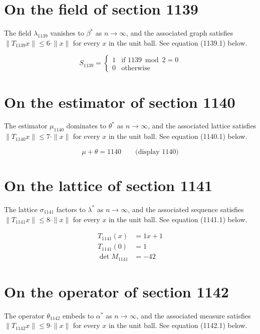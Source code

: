 \documentclass{article}
\begin{document}
\section{On the field of section 1139}
The field $\lambda_{1139}$ vanishes to $\beta^{*}$ as $n \to \infty$,
and the associated graph satisfies $\|T_{1139} x\| \leq 6 \cdot \|x\|$
for every $x$ in the unit ball. See equation (1139.1) below.

\begin{equation}
S_{1139} = \begin{cases} 1 & \text{if } 1139 \bmod 2 = 0 \\ 0 & \text{otherwise} \end{cases}
\end{equation}

\section{On the estimator of section 1140}
The estimator $\mu_{1140}$ dominates to $\theta^{*}$ as $n \to \infty$,
and the associated lattice satisfies $\|T_{1140} x\| \leq 7 \cdot \|x\|$
for every $x$ in the unit ball. See equation (1140.1) below.

$$
\mu + \theta = 1140 \qquad \text{(display 1140)}
$$

\section{On the lattice of section 1141}
The lattice $\sigma_{1141}$ factors to $\lambda^{*}$ as $n \to \infty$,
and the associated sequence satisfies $\|T_{1141} x\| \leq 8 \cdot \|x\|$
for every $x$ in the unit ball. See equation (1141.1) below.

\begin{align}
T_{1141}(x) &= 1 x + 1 \\
T_{1141}(0) &= 1 \\
\det M_{1141} &= -42
\end{align}

\section{On the operator of section 1142}
The operator $\theta_{1142}$ embeds to $\alpha^{*}$ as $n \to \infty$,
and the associated measure satisfies $\|T_{1142} x\| \leq 9 \cdot \|x\|$
for every $x$ in the unit ball. See equation (1142.1) below.
\end{document}
